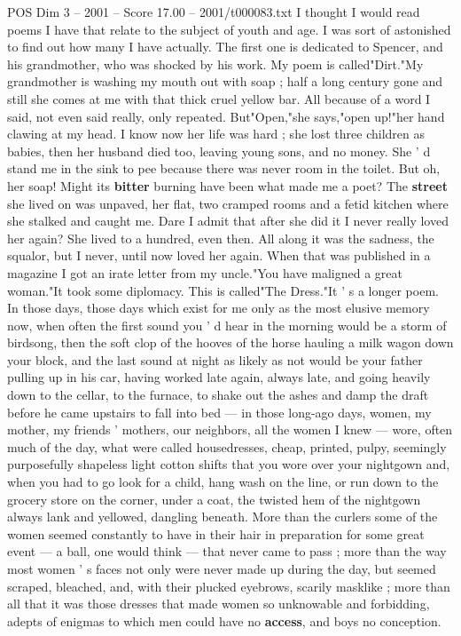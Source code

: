 \begin{textsample}{POS Dim 3 – 2001 – Score 17.00 – 2001/t000083.txt}  \label{ex:f3_pos_001}
I thought I would read poems I have that relate to the subject of youth and age.
I was sort of astonished to find out how many I have actually.
The first one is dedicated to Spencer, and his grandmother, who was shocked by his work.
My poem is called"Dirt."My grandmother is washing my mouth out with soap ; half a long century gone and still she comes at me with that thick cruel yellow bar.
All because of a word I said, not even said really, only repeated.
But"Open,"she says,"open up!"her hand clawing at my head.
I know now her life was hard ; she lost three children as babies, then her husband died too, leaving young sons, and no money.
She ' d stand me in the sink to pee because there was never room in the toilet.
But oh, her soap!
Might its \textbf{bitter} burning have been what made me a poet?
The \textbf{street} she lived on was unpaved, her flat, two cramped rooms and a fetid kitchen where she stalked and caught me.
Dare I admit that after she did it I never really loved her again?
She lived to a hundred, even then.
All along it was the sadness, the squalor, but I never, until now loved her again.
When that was published in a magazine I got an irate letter from my uncle."You have maligned a great woman."It took some diplomacy.
This is called"The Dress."It ' s a longer poem.
In those days, those days which exist for me only as the most elusive memory now, when often the first sound you ' d hear in the morning would be a storm of birdsong, then the soft clop of the hooves of the horse hauling a milk wagon down your block, and the last sound at night as likely as not would be your father pulling up in his car, having worked late again, always late, and going heavily down to the cellar, to the furnace, to shake out the ashes and damp the draft before he came upstairs to fall into bed — in those long-ago days, women, my mother, my friends ' mothers, our neighbors, all the women I knew — wore, often much of the day, what were called housedresses, cheap, printed, pulpy, seemingly purposefully shapeless light cotton shifts that you wore over your nightgown and, when you had to go look for a child, hang wash on the line, or run down to the grocery store on the corner, under a coat, the twisted hem of the nightgown always lank and yellowed, dangling beneath.
More than the curlers some of the women seemed constantly to have in their hair in preparation for some great event — a ball, one would think — that never came to pass ; more than the way most women ' s faces not only were never made up during the day, but seemed scraped, bleached, and, with their plucked eyebrows, scarily masklike ; more than all that it was those dresses that made women so unknowable and forbidding, adepts of enigmas to which men could have no \textbf{access}, and boys no conception.

\end{textsample}
